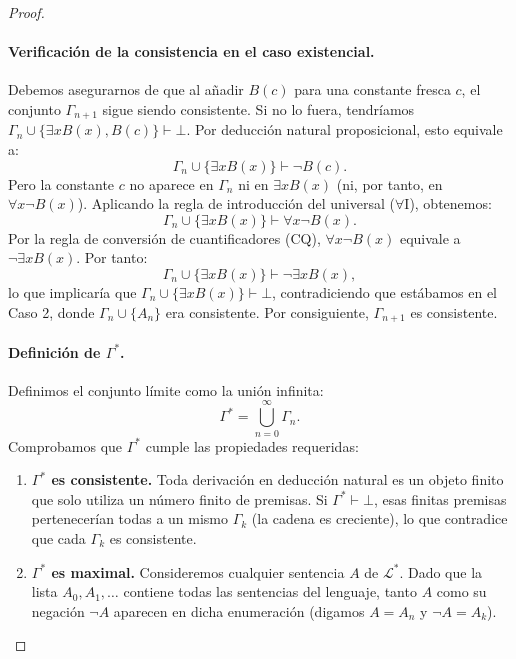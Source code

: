 \begin{proof}
\paragraph{Verificación de la consistencia en el caso existencial.}  
Debemos asegurarnos de que al añadir $B(c)$ para una constante fresca $c$, el conjunto $\Gamma_{n+1}$ sigue siendo consistente. Si no lo fuera, tendríamos $\Gamma_n \cup \{\exists x B(x), B(c)\} \vdash \bot$. Por deducción natural proposicional, esto equivale a:
\[
\Gamma_n \cup \{\exists x B(x)\} \vdash \neg B(c).
\]
Pero la constante $c$ no aparece en $\Gamma_n$ ni en $\exists x B(x)$ (ni, por tanto, en $\forall x \neg B(x)$). Aplicando la regla de introducción del universal ($\forall\text{I}$), obtenemos:
\[
\Gamma_n \cup \{\exists x B(x)\} \vdash \forall x \neg B(x).
\]
Por la regla de conversión de cuantificadores (CQ), $\forall x \neg B(x)$ equivale a $\neg \exists x B(x)$. Por tanto:
\[
\Gamma_n \cup \{\exists x B(x)\} \vdash \neg \exists x B(x),
\]
lo que implicaría que $\Gamma_n \cup \{\exists x B(x)\} \vdash \bot$, contradiciendo que estábamos en el Caso 2, donde $\Gamma_n \cup \{A_n\}$ era consistente. Por consiguiente, $\Gamma_{n+1}$ es consistente.

\paragraph{Definición de $\Gamma^*$.} Definimos el conjunto límite como la unión infinita:
\[
\Gamma^* = \bigcup_{n=0}^{\infty} \Gamma_n.
\]
Comprobamos que $\Gamma^*$ cumple las propiedades requeridas:
\begin{enumerate}
    \item \textbf{$\Gamma^*$ es consistente.} Toda derivación en deducción natural es un objeto finito que solo utiliza un número finito de premisas. Si $\Gamma^* \vdash \bot$, esas finitas premisas pertenecerían todas a un mismo $\Gamma_k$ (la cadena es creciente), lo que contradice que cada $\Gamma_k$ es consistente.
    \item \textbf{$\Gamma^*$ es maximal.} Consideremos cualquier sentencia $A$ de $\mathcal{L}^*$. Dado que la lista $A_0, A_1, \dots$ contiene todas las sentencias del lenguaje, tanto $A$ como su negación $\neg A$ aparecen en dicha enumeración (digamos $A = A_n$ y $\neg A = A_k$).
    

\end{enumerate}
\end{proof}
